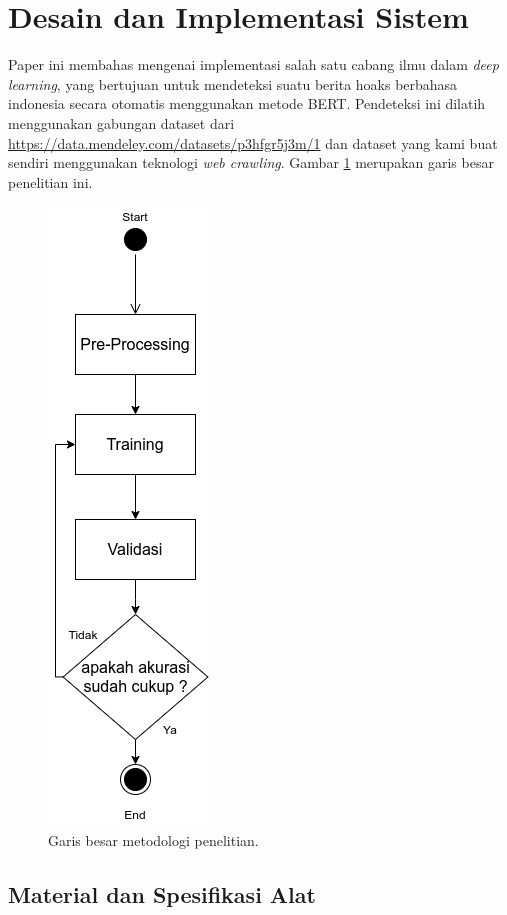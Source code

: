 \section{Desain dan Implementasi Sistem}
\label{sec:desainimplementasi}

Paper ini membahas mengenai implementasi salah satu cabang ilmu dalam \textit{deep learning}, yang bertujuan untuk mendeteksi suatu berita hoaks berbahasa indonesia secara otomatis menggunakan metode BERT. Pendeteksi ini dilatih menggunakan gabungan dataset dari \url{https://data.mendeley.com/datasets/p3hfgr5j3m/1} dan dataset yang kami buat sendiri menggunakan teknologi \textit{web crawling}. Gambar \ref{fig:metodologi} merupakan garis besar penelitian ini.

\begin{figure} [ht]
    \centering
    \includegraphics[width=0.3\linewidth]{gambar/metodologi_long.png}
    \caption{Garis besar metodologi penelitian.}
    \label{fig:metodologi}
\end{figure}

\subsection{Material dan Spesifikasi Alat}

